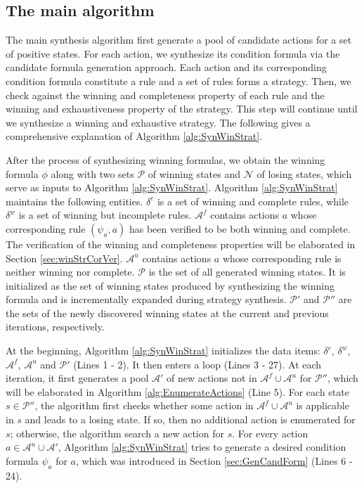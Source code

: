 \documentclass[review]{elsarticle}
\newcommand{\positiveSet}{\mathcal{P}}
\newcommand{\negativeSet}{\mathcal{N}}
\newcommand{\act}{\mathcal{A}}
\newcommand{\suc}{\tau}
\begin{document}
\subsection{The main algorithm}
The main synthesis algorithm first generate a pool of candidate actions for a set of positive states.
For each action, we synthesize its condition formula via the candidate formula generation approach.
Each action and its corresponding condition formula constitute a rule and a set of rules forms a strategy.
Then, we check against the winning and completeness property of each rule and the winning and exhaustiveness property of the strategy.
This step will continue until we synthesize a winning and exhaustive strategy. %
The following gives a comprehensive explanation of Algorithm \ref{alg:SynWinStrat}.

After the process of synthesizing winning formulas, we obtain the winning formula $\phi$ along with two sets $\positiveSet$ of winning states and $\negativeSet$ of losing states, which serve as inputs to Algorithm \ref{alg:SynWinStrat}.
Algorithm \ref{alg:SynWinStrat} maintains the following entities.
$\delta^c$ is a set of winning and complete rules, while $\delta^w$ is a set of winning but incomplete rules.
$\act^f$ contains actions $a$ whose corresponding rule $(\psi_a, a)$ has been verified to be both winning and complete. %
The verification of the winning and completeness properties will be elaborated in Section \ref{sec:winStrCorVer}.
$\act^u$ contains actions $a$ whose corresponding rule is neither winning nor complete. %
$\positiveSet$ is the set of all generated winning states.
It is initialized as the set of winning states produced by synthesizing the winning formula and is incrementally expanded during strategy synthesis.
$\positiveSet'$ and $\positiveSet''$ are the sets of the newly discovered winning states at the current and previous iterations, respectively.


At the beginning, Algorithm \ref{alg:SynWinStrat} initializes the data items: $\delta^c$, $\delta^w$, $\act^f$, $\act^u$ and $\positiveSet'$ (Lines 1 - 2).
It then enters a loop (Lines 3 - 27).
At each iteration, it first generates a pool $\act'$ of new actions not in $\act^f \cup \act^u$ for $\positiveSet''$, which will be elaborated in Algorithm \ref{alg:EnumerateActions}  (Line 5).
For each state $s \in \positiveSet''$, the algorithm first checks whether some action in $\act^f \cup \act^u$ is applicable in $s$ and leads to a losing state.
If so, then no additional action is enumerated for $s$; otherwise, the algorithm search a new action for $s$.
For every action $a \in \act^u \cup \act'$, Algorithm \ref{alg:SynWinStrat} tries to generate a desired condition formula $\psi_a$ for $a$, which was introduced in Section \ref{sec:GenCandForm} (Lines 6 - 24).
\end{document}
